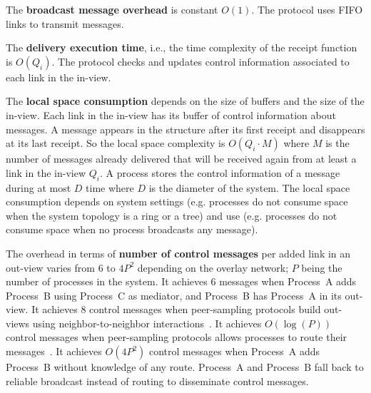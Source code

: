\noindent The \textbf{broadcast message overhead} is constant $O(1)$. The
protocol uses FIFO links to transmit messages.

\noindent The \textbf{delivery execution time}, i.e., the time complexity of the
receipt function is $O(Q_i)$. The protocol checks and updates control
information associated to each link in the in-view. 

\noindent The \textbf{local space consumption} depends on the size of buffers
and the size of the in-view. Each link in the in-view has its buffer of control
information about messages. A message appears in the structure after its first
receipt and disappears at its last receipt. So the local space complexity is
$O(Q_i \cdot M)$ where $M$ is the number of messages already delivered that will
be received again from at least a link in the in-view $Q_i$. A process stores the
control information of a message during at most $D$ time where $D$ is the
diameter of the system. The local space consumption depends on system settings
(e.g. processes do not consume space when the system topology is a ring or a
tree) and use (e.g. processes do not consume space when no process broadcasts
any message).

\noindent The overhead in terms of \textbf{number of control messages} per added
link in an out-view varies from $6$ to $4P^2$ depending on the overlay network;
$P$ being the number of processes in the system. It achieves $6$ messages when
Process~A adds Process~B using Process~C as mediator, and Process~B has
Process~A in its out-view.  It achieves $8$ control messages when peer-sampling
protocols build out-views using neighbor-to-neighbor
interactions~\cite{jelasity2007gossip,nedelec2017adaptive}. It achieves
$O(\log(P))$ control messages when peer-sampling protocols allows processes to
route their messages~\cite{jelasity2009tman,stoica2001chord}.  It achieves
$O(4P^2)$ control messages when Process~A adds Process~B without knowledge of
any route. Process~A and Process~B fall back to reliable broadcast instead of
routing to disseminate control messages.

